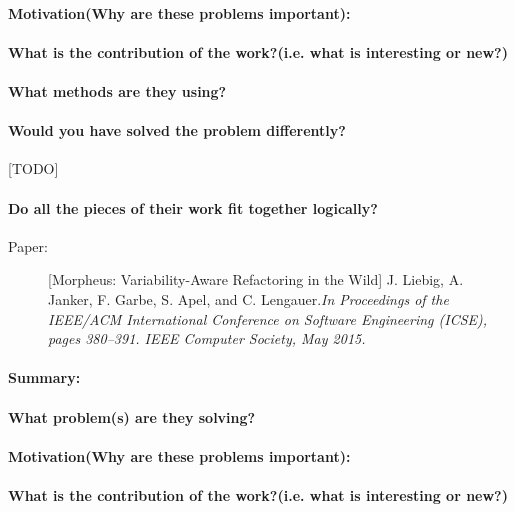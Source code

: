 \documentclass[12pt]{article}
\begin{document}
\paragraph{Motivation(Why are these problems important):}
\paragraph{What is the contribution of the work?(i.e. what is interesting or new?)}
\paragraph{What methods are they using?}
\paragraph{Would you have solved the problem differently?}[TODO]
\paragraph{Do all the pieces of their work fit together logically?}





\clearpage
\begin{description}
\item[Paper:] [Morpheus: Variability-Aware Refactoring in the Wild] J. Liebig, A. Janker, F. Garbe, S. Apel, and C. Lengauer.\emph{In Proceedings of the IEEE/ACM International Conference on Software Engineering (ICSE), pages 380–391. IEEE Computer Society, May 2015.} 
\end{description}

\paragraph{Summary:}
\paragraph{What problem(s) are they solving?} 
\paragraph{Motivation(Why are these problems important):}
\paragraph{What is the contribution of the work?(i.e. what is interesting or new?)}
\end{document}
